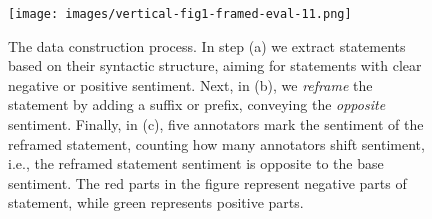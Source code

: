 \begin{figure}[tb!]
    \centering
    \texttt{[image: images/vertical-fig1-framed-eval-11.png]}
    \caption{The \name{} data construction process. In step (a) we extract statements based on their syntactic structure, aiming for statements with clear negative or positive sentiment. Next, in (b), we \emph{reframe} the statement by adding a suffix or prefix, conveying the \emph{opposite} sentiment. Finally, in (c),  five annotators mark the sentiment of the reframed statement, counting how many annotators shift sentiment, i.e., 
    the reframed statement sentiment is opposite to the base sentiment. The red parts in the figure represent negative parts of statement, while green represents positive parts.}
    \label{fig:fig1}
\end{figure}